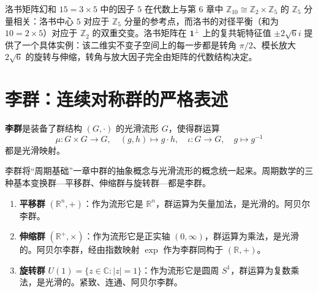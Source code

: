 \begin{remark}\label{rem:luoshu_hetu_interface}
洛书矩阵幻和 $15 = 3 \times 5$ 中的因子 $5$ 在代数上与第 6 章中 $\mathbb{Z}_{10} \cong \mathbb{Z}_2 \times \mathbb{Z}_5$ 的 $\mathbb{Z}_5$ 分量相关：洛书中心 $5$ 对应于 $\mathbb{Z}_5$ 分量的参考点，而洛书的对径平衡（和为 $10 = 2 \times 5$）对应于 $\mathbb{Z}_2$ 的双重交变。洛书矩阵在 $\mathbf{1}^\perp$ 上的复共轭特征值 $\pm 2\sqrt{6}i$ 提供了一个具体实例：该二维实不变子空间上的每一步都是转角 $\pi/2$、模长放大 $2\sqrt{6}$ 的旋转与伸缩，转角与放大因子完全由矩阵的代数结构决定。
\end{remark}

\section{\texorpdfstring{李群：连续对称群的严格表述}{李群}}

\begin{definition}[李群]\label{def:lie_group}
\textbf{李群}是装备了群结构 $(G, \cdot)$ 的光滑流形 $G$，使得群运算
\[
\mu: G \times G \to G, \quad (g, h) \mapsto g \cdot h, \quad
\iota: G \to G, \quad g \mapsto g^{-1}
\]
都是光滑映射。

李群将“周期基础”一章中群的抽象概念与光滑流形的概念统一起来。周期数学的三种基本变换群---平移群、伸缩群与旋转群---都是李群。
\end{definition}

\begin{example}[三个变换群都是李群]\label{ex:three_lie_groups}
\begin{enumerate}[label=(\roman*)]
    \item \textbf{平移群} $(\mathbb{R}^n, +)$：作为流形它是 $\mathbb{R}^n$，群运算为矢量加法，是光滑的。阿贝尔李群。
    \item \textbf{伸缩群} $(\mathbb{R}^+, \times)$：作为流形它是正实轴 $(0, \infty)$，群运算为乘法，是光滑的。阿贝尔李群，经由指数映射 $\exp$ 作为李群同构于 $(\mathbb{R}, +)$。
    \item \textbf{旋转群} $U(1) = \{z \in \mathbb{C} : |z| = 1\}$：作为流形它是圆周 $S^1$，群运算为复数乘法，是光滑的。紧致、连通、阿贝尔李群。
\end{enumerate}
\end{example}

